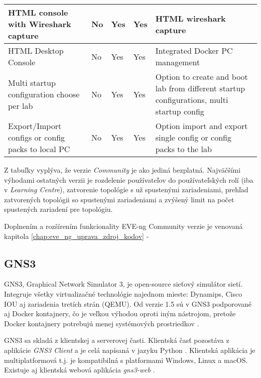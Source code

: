 \begin{longtable}{| m{3cm} | m{2cm} | m{2cm} | m{2cm} | m{4cm} |}
HTML console with Wireshark capture                   & No                & Yes             & Yes                  & HTML wireshark capture                                                                                        \\ \hline
HTML Desktop Console                                  & No                & Yes             & Yes                  & Integrated Docker PC management                                                                               \\ \hline
Multi startup configuration choose per lab            & No                & Yes             & Yes                  & Option to create and boot lab from different startup configurations, multi startup config                     \\ \hline
Export/Import configs or config packs to local PC     & No                & Yes             & Yes                  & Option import and export single config or config packs to the lab                                             \\ \hline  
\end{longtable}

Z tabuľky vyplýva, že verzie \emph{Community} je ako jediná bezplatná. Najväčšími výhodami ostatných verzii je rozdelenie používateľov do používateľských rolí (iba v \emph{Learning Centre}), zatvorenie topológie s už spustenými zariadeniami, prehľad zatvorených topológii so spustenými zariadeniami a zvýšený limit na počet spustených zariadení pre topológiu.

Doplnením a rozšírením funkcionality EVE-ng Community verzie je venovaná kapitola \ref{chap:eve_ng_uprava_zdroj_kodov} - 

\subsection{GNS3}

GNS3, Graphical Network Simulator 3, je open-source sieťový simulátor sietí. Integruje všetky virtualizačné technológie najednom mieste: Dynamips, Cisco IOU aj zariadenia tretích strán (QEMU). Od verzie 1.5 sú v GNS3 podporované aj Docker kontajnery, čo je veľkou výhodou oproti iným nástrojom, pretože Docker kontajnery potrebujú menej systémových prostriedkov \cite{gns3_docker}.

GNS3 sa skladá z klientskej a serverovej časti. Klientská časť pozostáva z aplikácie \emph{GNS3 Client} a je celá napísaná v jazyku Python \cite{gns3_gui_github}. Klientská aplikácia je multiplatformová t.j. je kompatibilná s platformami Windows, Linux a macOS. Existuje aj klientská webová aplikácia \emph{gns3-web} \cite{gns3_web_github}.

